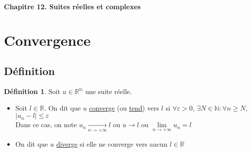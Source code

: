 \documentclass[10pt,a4paper]{article}
\theoremstyle{definition}
\newtheorem{definition}[proposition]{Définition}
\begin{document}
\renewcommand{\labelitemi}{$*$}
\renewcommand{\labelenumi}{(\roman{enumi})}
\begin{center}
{\Large \textbf{Chapitre 12. Suites réelles et complexes}}
\end{center}

\section{Convergence}
\subsection{Définition}
\begin{definition}
Soit $u \in \mathbb{R}^\mathbb{N}$ une suite réelle.
\begin{itemize}
\item Soit $l \in \mathbb{R}$. On dit que $u$ \uline{converge} (ou \uline{tend}) vers $l$ si $\forall \varepsilon > 0$, $\exists N \in \mathbb{N}: \forall n \geq N$, $\left| u_n - l \right| \leq \varepsilon$  \\
Dans ce cas, on note $u_n \xrightarrow[n \to +\infty]{} l$ ou $u \to l$ ou $\lim\limits_{n \to +\infty} u_n = l$
\item On dit que $u$ \uline{diverge} si elle ne converge vers aucun $l \in \mathbb{R}$
\end{itemize}
\end{definition}
\end{document}
